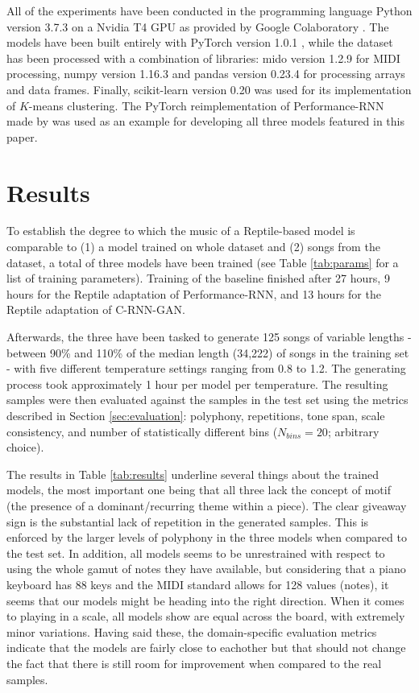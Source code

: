 \documentclass[a4paper]{book}
\begin{document}
All of the experiments have been conducted in the programming language Python version 3.7.3 \parencite{rossum_python_2019} on a Nvidia T4 GPU as provided by Google Colaboratory \parencite{google_colaboratory_2019}. The models have been built entirely with PyTorch version 1.0.1 \parencite{paszke_automatic_2017}, while the dataset has been processed with a combination of libraries: mido version 1.2.9 \parencite{bjorndalen_mido_2018} for MIDI processing, numpy version 1.16.3 \parencite{walt_numpy_2011} and pandas version 0.23.4 \parencite{mckinney_data_2010} for processing arrays and data frames. Finally, scikit-learn version 0.20 \parencite{pedregosa_scikit-learn_2011} was used for its implementation of $K$-means clustering. The PyTorch reimplementation of Performance-RNN made by \textcite{lee_event-based_2019} was used as an example for developing all three models featured in this paper.

\chapter{Results}\label{chap:results}

To establish the degree to which the music of a Reptile-based model is comparable to (1) a model trained on whole dataset and (2) songs from the dataset, a total of three models have been trained (see Table \ref{tab:params} for a list of training parameters). Training of the baseline finished after 27 hours, 9 hours for the Reptile adaptation of Performance-RNN, and 13 hours for the Reptile adaptation of C-RNN-GAN.

Afterwards, the three have been tasked to generate 125 songs of variable lengths - between 90\% and 110\% of the median length (34,222) of songs in the training set - with five different temperature settings ranging from 0.8 to 1.2. The generating process took approximately 1 hour per model per temperature. The resulting samples were then evaluated against the samples in the test set using the metrics described in Section \ref{sec:evaluation}: polyphony, repetitions, tone span, scale consistency, and number of statistically different bins ($N_{bins} = 20$; arbitrary choice).

The results in Table \ref{tab:results} underline several things about the trained models, the most important one being that all three lack the concept of motif (the presence of a dominant/recurring theme within a piece). The clear giveaway sign is the substantial lack of repetition in the generated samples. This is enforced by the larger levels of polyphony in the three models when compared to the test set. In addition, all models seems to be unrestrained with respect to using the whole gamut of notes they have available, but considering that a piano keyboard has 88 keys and the MIDI standard allows for 128 values (notes), it seems that our models might be heading into the right direction. When it comes to playing in a scale, all models show are equal across the board, with extremely minor variations. Having said these, the domain-specific evaluation metrics indicate that the models are fairly close to eachother but that should not change the fact that there is still room for improvement when compared to the real samples.
\end{document}
